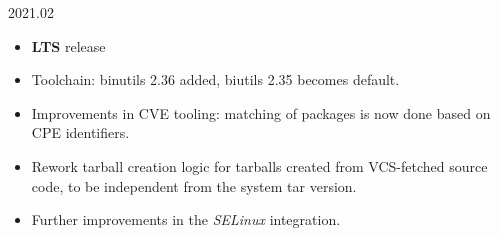 \begin{frame}{2021.02}
  \begin{itemize}
  \item {\bf LTS} release
  \item Toolchain: binutils 2.36 added, biutils 2.35 becomes default.
  \item Improvements in CVE tooling: matching of packages is now done
    based on CPE identifiers.
  \item Rework tarball creation logic for tarballs created from
    VCS-fetched source code, to be independent from the system tar
    version.
  \item Further improvements in the {\em SELinux} integration.
  \end{itemize}
\end{frame}
